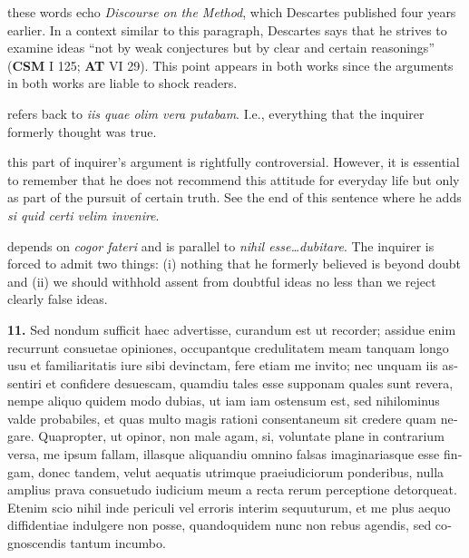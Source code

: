  these words echo \textit{Discourse on the Method}, which Descartes published four years earlier. In a context similar to this paragraph, Descartes says that he strives to examine ideas ``not by weak conjectures but by clear and certain reasonings'' (\textbf{CSM} I 125; \textbf{AT} VI 29). This point appears in both works since the arguments in both works are liable to shock readers.

 refers back to \textit{iis quae olim vera putabam}. I.e., everything that the inquirer formerly thought was true.

 this part of inquirer's argument is rightfully controversial. However, it is essential to remember that he does not recommend this attitude for everyday life but only as part of the pursuit of certain truth. See the end of this sentence where he adds \textit{si quid certi velim invenire}.

 depends on \textit{cogor fateri} and is parallel to \textit{nihil esse\dots dubitare}. The inquirer is forced to admit two things: (i) nothing that he formerly believed is beyond doubt and (ii) we should withhold assent from doubtful ideas no less than we reject clearly false ideas.


\clearpage

\beginnumbering
\pstart
\begin{latin}
    \textenglish{\textbf{11.}} Sed nondum sufficit haec advertisse, curandum est ut recorder; assidue enim recurrunt consuetae opiniones, occupantque credulitatem meam tanquam longo usu et familiaritatis iure sibi devinctam, fere etiam me invito; nec unquam iis assentiri et confidere desuescam, quamdiu tales esse supponam quales sunt revera, nempe aliquo quidem modo dubias, ut iam iam ostensum est, sed nihilominus valde probabiles, et quas multo magis rationi consentaneum sit credere quam negare. Quapropter, ut opinor, non male agam, si, voluntate plane in contrarium versa, me ipsum fallam, illasque aliquandiu omnino falsas imaginariasque esse fingam, donec tandem, velut aequatis utrimque praeiudiciorum ponderibus, nulla amplius prava consuetudo iudicium meum a recta rerum perceptione detorqueat. Etenim scio nihil inde periculi vel erroris interim sequuturum, et me plus aequo diffidentiae indulgere non posse, quandoquidem nunc non rebus agendis, sed cognoscendis tantum incumbo.
\end{latin}
\pend
\endnumbering

